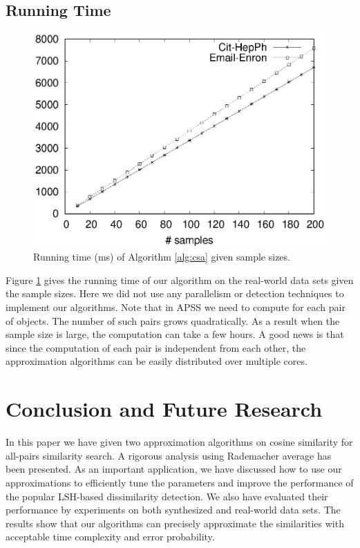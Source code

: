 \documentclass[sigconf,anonymous]{acmart}
\begin{document}
\subsection{Running Time}
\begin{figure}[!t]
\centering
\begin{minipage}{.45\textwidth}
\centering
\includegraphics[width=.9\textwidth]{cos_runtime.eps}
\caption{Running time (ms) of Algorithm \ref{alg:csa} given sample sizes.}
\label{fig:run_cos}
\end{minipage}
\end{figure}

Figure \ref{fig:run_cos} gives the running time of our algorithm on the real-world data sets given the sample sizes. Here we did not use any parallelism or detection techniques to implement our algorithms. Note that in APSS we need to compute for each pair of objects. The number of such pairs grows quadratically. As a result when the sample size is large, the computation can take a few hours. A good news is that since the computation of each pair is independent from each other, the approximation algorithms can be easily distributed over multiple cores.

\section{Conclusion and Future Research}
\label{sec:con}
In this paper we have given two approximation algorithms on cosine similarity for all-pairs similarity search. 
A rigorous analysis using Rademacher average has been presented. 
{\color{black}As an important application, we have discussed how to use our approximations to efficiently tune the parameters and improve the performance of the popular LSH-based dissimilarity detection. }
We also have evaluated their performance by experiments on both synthesized and real-world data sets. The results show that our algorithms can precisely approximate the similarities with acceptable time complexity and error probability. 
\end{document}
